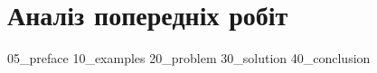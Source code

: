 \chapter{Аналіз попередніх робіт}
{05_preface}
{10_examples}
{20_problem}
{30_solution}
{40_conclusion}
